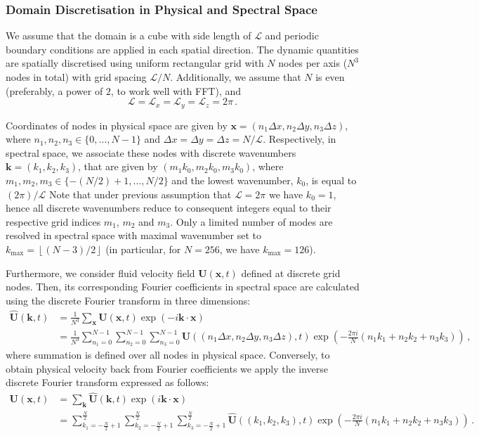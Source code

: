 \documentclass{pracamgren}
\begin{document}
\subsubsection{Domain Discretisation in Physical and Spectral Space}

We assume that the domain is a cube with side length of $\mathcal{L}$ and periodic boundary conditions are applied in each spatial direction.
The dynamic quantities are spatially discretised using uniform rectangular grid with $N$ nodes per axis ($N^3$ nodes in total) with grid spacing $\mathcal{L} / N$.
Additionally, we assume that $N$ is even (preferably, a power of $2$, to work well with FFT), and 
$$ \mathcal{L} = \mathcal{L}_x = \mathcal{L}_y = \mathcal{L}_z = 2 \pi \, .$$

Coordinates of nodes in physical space are given by $\mathbf{x} = (n_1 \Delta x, n_2 \Delta y, n_3 \Delta z)$, where $n_1, n_2, n_3 \in \{ 0, \ldots, N - 1 \}$ and $\Delta x = \Delta y = \Delta z = N / \mathcal{L}$.
Respectively, in spectral space, we associate these nodes with discrete wavenumbers $\mathbf{k} = (k_1, k_2, k_3)$, that are given by $(m_1 k_0, m_2 k_0, m_3 k_0)$, where $m_1, m_2, m_3 \in \{ -(N / 2) + 1 , \ldots, N / 2 \}$  and the lowest wavenumber, $k_0$, is equal to $(2 \pi) / \mathcal{L}$
Note that under previous assumption that $\mathcal{L} = 2 \pi$ we have $k_0 = 1$, hence all discrete wavenumbers reduce to consequent integers equal to their respective grid indices $m_1$, $m_2$ and $m_3$.
Only a limited number of modes are resolved in spectral space with maximal wavenumber set to $k_{\max} = \left\lfloor (N - 3) / 2 \right\rfloor$ (in particular, for $N=256$, we have $k_{\max} = 126$).


Furthermore, we consider fluid velocity field $\mathbf{U}(\mathbf{x}, t)$ defined at discrete grid nodes.
Then, its corresponding Fourier coefficients in spectral space are calculated using the discrete Fourier transform in three dimensions:
\begin{align*}
\mathbf{\hat{U}}(\mathbf{k}, t) &= \frac{1}{N^3} \sum_{\mathbf{x}} \mathbf{U}(\mathbf{x}, t) \exp(-i \mathbf{k} \cdot \mathbf{x}) \\
                                &= \frac{1}{N^3} \sum_{n_1 = 0}^{N-1} \sum_{n_2 = 0}^{N-1} \sum_{n_3 = 0}^{N-1} \mathbf{U} ((n_1 \Delta x, n_2 \Delta y, n_3 \Delta z), t) \exp(- \frac{2 \pi i}{N}(n_1 k_1 + n_2 k_2 + n_3 k_3)) \, ,
\end{align*}
where summation is defined over all nodes in physical space.
Conversely, to obtain physical velocity back from Fourier coefficients we apply the inverse discrete Fourier transform expressed as follows:
\begin{align*}
\mathbf{U}(\mathbf{x}, t) &= \sum_{\mathbf{k}} \mathbf{\hat{U}} (\mathbf{k}, t) \exp(i \mathbf{k} \cdot \mathbf{x}) \\
                          &= \sum_{k_1 = - \frac{N}{2} + 1}^{\frac{N}{2}} \sum_{k_2 = - \frac{N}{2} + 1}^{\frac{N}{2}} \sum_{k_3 = - \frac{N}{2} + 1}^{\frac{N}{2}} \mathbf{\hat{U}}((k_1, k_2, k_3), t) \exp \left( - \frac{2 \pi i}{N}(n_1 k_1 + n_2 k_2 + n_3 k_3) \right) \, .
\end{align*}
\end{document}
